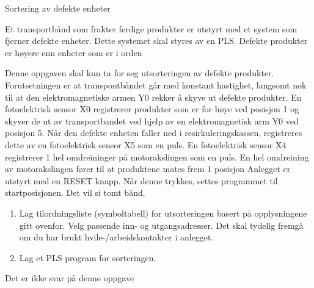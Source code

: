 

Sortering av defekte enheter 

Et transportbånd som frakter ferdige produkter er utstyrt med et system
som fjerner defekte enheter. Dette systemet skal styres av en PLS.
Defekte produkter er høyere enn enheter som er i orden


Denne oppgaven skal kun ta for seg utsorteringen av defekte produkter.
Forutsetningen er at transpontbåndet går med konstant hastighet, langsomt
nok til at den elektromagnetiske armen Y0 rekker å skyve ut defekte
produkter. En fotoelektrisk sensor X0 registrerer produkter som er
for høye ved posisjon 1 og skyver de ut av transportbandet ved hjelp
av en elektromagnetisk arm Y0 ved posisjon 5. Når den defekte enheten
faller ned i resirkuleringskassen, registreres dette av en fotoelektrisk
sensor X5 som en puls. En fotoelektrisk sensor X4 registrerer 1 hel
omdreininger på motorakslingen som en puls. En hel omdreining av motorakslingen
fører til at produktene mates frem 1 posisjon Anlegget er utstyrt
med en RESET knapp. Når denne trykkes, settes programmet til startposisjonen.
Det vil si tomt bånd. 
\begin{enumerate}
\item Lag tilordningsliste (symboltabell) for utsorteringen basert på opplysningene
gitt ovenfor. Velg passende inn- og utgangsadresser. Det skal tydelig
fremgå om du har brukt hvile-/arbeidskontakter i anlegget.
\item Lag et PLS program for sorteringen. 
\end{enumerate}

\vskip 10pt






Det er ikke svar på denne oppgave












